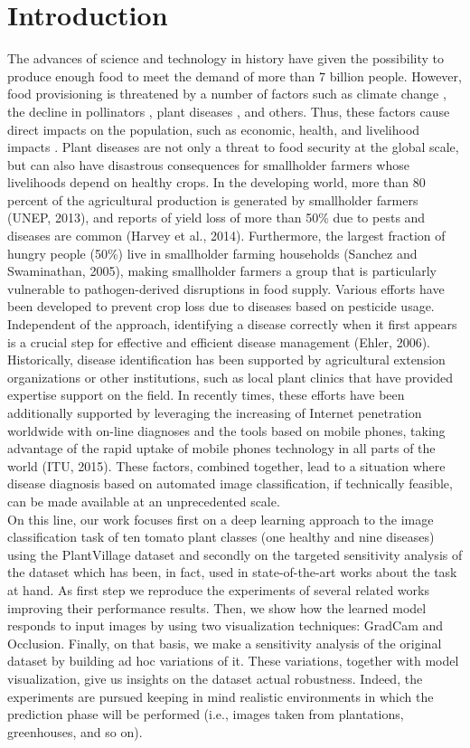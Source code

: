 \section{Introduction}
The advances of science and technology in history have given the possibility to produce enough food to meet the demand of more than 7 billion people. However, food provisioning is threatened by a number of factors such as climate change \cite{ref1}, the decline in pollinators \cite{ref2}, plant diseases \cite{ref3}, and others. Thus, these factors cause direct impacts on the population, such as economic, health, and livelihood impacts \cite{ref4}. Plant diseases are not only a threat to food security at the global scale, but can also have disastrous consequences for smallholder farmers whose livelihoods depend on healthy crops. In the developing world, more than 80 percent of the agricultural production is generated by smallholder farmers (UNEP, 2013), and reports of yield loss of more than 50\% due to pests and diseases are common (Harvey et al., 2014). Furthermore, the largest fraction of hungry people (50\%) live in smallholder farming households (Sanchez and Swaminathan, 2005), making smallholder farmers a group that is particularly vulnerable to pathogen-derived disruptions in food supply.
Various efforts have been developed to prevent crop loss due to diseases based on pesticide usage. Independent of the approach, identifying a disease correctly when it first appears is a crucial step for effective and efficient disease management (Ehler, 2006).
\\\indent
Historically, disease identification has been supported by agricultural extension organizations or other institutions, such as local plant clinics that have provided expertise support on the field. In recently times, these efforts have been additionally supported by leveraging the increasing of Internet penetration worldwide with on-line diagnoses and the tools based on mobile phones, taking advantage of the rapid uptake of mobile phones technology in all parts of the world (ITU, 2015). These factors, combined together, lead to a situation where disease diagnosis based on automated image classification, if technically feasible, can be made available at an unprecedented scale.
\\\indent
On this line, our work focuses first on a deep learning approach to the image classification task of ten tomato plant classes (one healthy and nine diseases) using the PlantVillage dataset \cite{PlantVillage} and secondly on the targeted sensitivity analysis of the dataset which has been, in fact, used in state-of-the-art works about the task at hand. As first step we reproduce the experiments of several related works improving their performance results. Then, we show how the learned model responds to input images by using two visualization techniques: GradCam and Occlusion. Finally, on that basis, we make a sensitivity analysis of the original dataset by building ad hoc variations of it. These variations, together with model visualization, give us insights on the dataset actual robustness. Indeed, the experiments are pursued keeping in mind realistic environments in which the prediction phase will be performed (i.e., images taken from plantations, greenhouses, and so on).